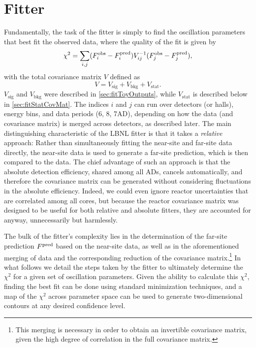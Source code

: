 \documentclass[../thesis.tex]{subfiles}
\begin{document}
\section{Fitter}
\label{sec:fitFitter}

Fundamentally, the task of the fitter \cite{berkeley_shapefit} is simply to find the oscillation parameters that best fit the observed data, where the quality of the fit is given by
\begin{equation}
  \chi^2 = \sum_{i,j} (F^{\mathrm{obs}}_i - F^{\mathrm{pred}}_i) V^{-1}_{ij} (F^{\mathrm{obs}}_j - F^{\mathrm{pred}}_j),
\end{equation}
with the total covariance matrix $V$ defined as
\begin{equation}
  V = V_{\mathrm{sig}} + V_{\mathrm{bkg}} + V_{\mathrm{stat}}.
\end{equation}
$V_{\mathrm{sig}}$ and $V_{\mathrm{bkg}}$ were described in \autoref{sec:fitToyOutputs}, while $V_{\mathrm{stat}}$ is described below in \autoref{sec:fitStatCovMat}. The indices $i$ and $j$ can run over detectors (or halls), energy bins, and data periods (6, 8, 7AD), depending on how the data (and covariance matrix) is merged across detectors, as described later. The main distinguishing characteristic of the LBNL fitter is that it takes a \emph{relative} approach: Rather than simultaneously fitting the near-site and far-site data directly, the near-site data is used to generate a far-site prediction, which is then compared to the data. The chief advantage of such an approach is that the absolute detection efficiency, shared among all ADs, cancels automatically, and therefore the covariance matrix can be generated without considering fluctuations in the absolute efficiency. Indeed, we could even ignore reactor uncertainties that are correlated among all cores, but because the reactor covariance matrix was designed to be useful for both relative and absolute fitters, they are accounted for anyway, unnecessarily but harmlessly.

The bulk of the fitter's complexity lies in the determination of the far-site prediction $F^{\mathrm{pred}}$ based on the near-site data, as well as in the aforementioned merging of data and the corresponding reduction of the covariance matrix.\footnote{This merging is necessary in order to obtain an invertible covariance matrix, given the high degree of correlation in the full covariance matrix.} In what follows we detail the steps taken by the fitter to ultimately determine the $\chi^2$ for a given set of oscillation parameters. Given the ability to calculate this $\chi^2$, finding the best fit can be done using standard minimization techniques, and a map of the $\chi^2$ across parameter space can be used to generate two-dimensional contours at any desired confidence level.
\end{document}
